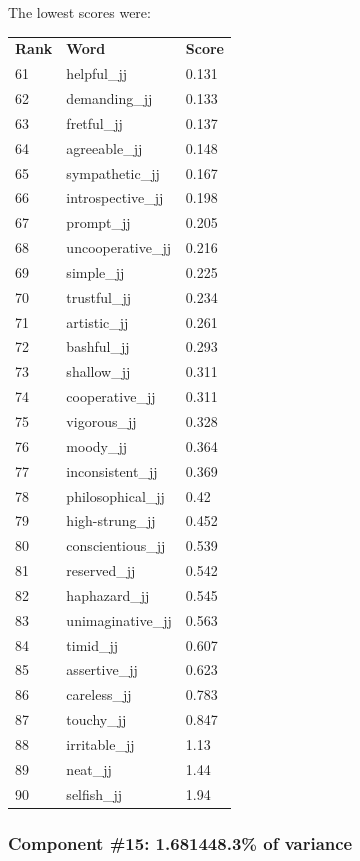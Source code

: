 \documentclass[10pt,letterpaper]{book}
\begin{document}
The lowest scores were:
\begin{tabular}{ l l l }
        \textbf{Rank} & \textbf{Word} & \textbf{Score} \\
        61 & helpful\_jj & 0.131 \\
        62 & demanding\_jj & 0.133 \\
        63 & fretful\_jj & 0.137 \\
        64 & agreeable\_jj & 0.148 \\
        65 & sympathetic\_jj & 0.167 \\
        66 & introspective\_jj & 0.198 \\
        67 & prompt\_jj & 0.205 \\
        68 & uncooperative\_jj & 0.216 \\
        69 & simple\_jj & 0.225 \\
        70 & trustful\_jj & 0.234 \\
        71 & artistic\_jj & 0.261 \\
        72 & bashful\_jj & 0.293 \\
        73 & shallow\_jj & 0.311 \\
        74 & cooperative\_jj & 0.311 \\
        75 & vigorous\_jj & 0.328 \\
        76 & moody\_jj & 0.364 \\
        77 & inconsistent\_jj & 0.369 \\
        78 & philosophical\_jj & 0.42 \\
        79 & high-strung\_jj & 0.452 \\
        80 & conscientious\_jj & 0.539 \\
        81 & reserved\_jj & 0.542 \\
        82 & haphazard\_jj & 0.545 \\
        83 & unimaginative\_jj & 0.563 \\
        84 & timid\_jj & 0.607 \\
        85 & assertive\_jj & 0.623 \\
        86 & careless\_jj & 0.783 \\
        87 & touchy\_jj & 0.847 \\
        88 & irritable\_jj & 1.13 \\
        89 & neat\_jj & 1.44 \\
        90 & selfish\_jj & 1.94 \\
\end{tabular}
\subsubsection{Component \#15: 1.681448.3\% of variance}
\end{document}
